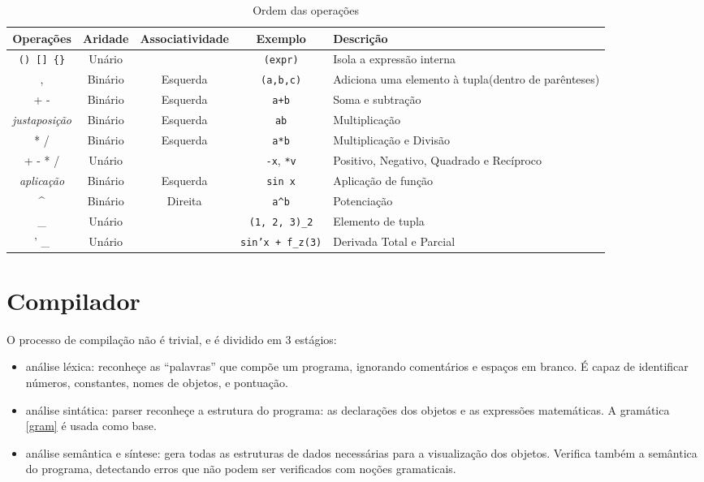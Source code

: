 \begin{table}[ht]
\caption{Ordem das operações}
\label{order}
\begin{centering}
\begin{tabularx}{\textwidth}{||c|c|c|c|X||}
    \cline{1-5}
    Operações & Aridade & Associatividade & Exemplo & Descrição \\ \hline \hline

    \texttt{() [] \{\}} & Unário &  & \texttt{(expr)} & Isola a expressão interna \\ \hline
    , & Binário & Esquerda & \texttt{(a,b,c)} & Adiciona uma elemento à tupla(dentro de parênteses) \\ \hline
    + - & Binário & Esquerda & \texttt{a+b} & Soma e subtração \\ \hline
    \textit{justaposição} & Binário & Esquerda & \texttt{ab} & Multiplicação \\ \hline
    * / & Binário & Esquerda & \texttt{a*b} & Multiplicação e Divisão \\ \hline
    + - * / & Unário &  & \texttt{-x}, \texttt{*v} & Positivo, Negativo, Quadrado e Recíproco \\ \hline
    \textit{aplicação} & Binário & Esquerda & \texttt{sin x} & Aplicação de função \\ \hline
    \textasciicircum & Binário & Direita & \texttt{a\textasciicircum b} & Potenciação \\ \hline
    \_ & Unário & & \texttt{(1, 2, 3)\_2} & Elemento de tupla \\ \hline
    ' \_ & Unário & & \texttt{sin'x + f\_z(3)} & Derivada Total e Parcial \\ \hline
    \cline{1-5}
\end{tabularx}
\end{centering}
\end{table}

\section{Compilador}
O processo de compilação não é trivial, e é dividido em 3 estágios:
\begin{itemize}
    \item análise léxica: reconheçe as ``palavras'' que compõe um programa,
    ignorando comentários e espaços em branco. É capaz de identificar números, 
    constantes, nomes de objetos, e pontuação.

    \item análise sintática: parser reconheçe a estrutura do programa: as declarações dos objetos
    e as expressões matemáticas. A gramática \ref{gram} é usada como base.

    \item análise semântica e síntese: gera todas as estruturas de dados
    necessárias para a visualização dos objetos. Verifica também a semântica do programa,
    detectando erros que não podem ser verificados com noções gramaticais.
\end{itemize}

